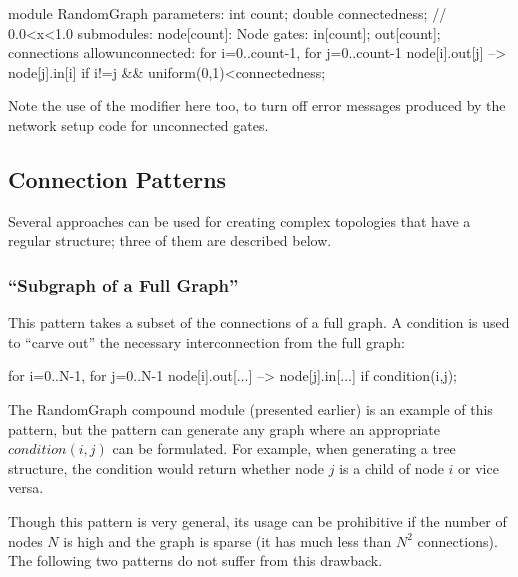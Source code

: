 \begin{ned}
module RandomGraph {
    parameters:
        int count;
        double connectedness; // 0.0<x<1.0
    submodules:
        node[count]: Node {
            gates:
                in[count];
                out[count];
        }
    connections allowunconnected:
        for i=0..count-1, for j=0..count-1 {
            node[i].out[j] --> node[j].in[i]
                if i!=j && uniform(0,1)<connectedness;
        }
}
\end{ned}

Note the use of the  modifier
here too, to turn off error messages produced by the network setup code
for unconnected gates.


\subsection{Connection Patterns}
\label{sec:ned-lang:connection-design-patterns}


Several approaches can be used for creating complex topologies that have a
regular structure; three of them are described below.


\subsubsection{``Subgraph of a Full Graph''}
\label{sec:ned-lang:subgraph-of-full-graph}


This pattern takes a subset of the connections of a full graph.  A
condition is used to ``carve out'' the necessary interconnection from
the full graph:

\begin{ned}
for i=0..N-1, for j=0..N-1 {
    node[i].out[...] --> node[j].in[...] if condition(i,j);
}
\end{ned}

The RandomGraph compound module (presented earlier) is an example of
this pattern, but the pattern can generate any graph where an
appropriate $condition(i,j)$ can be formulated. For example,
when generating a tree structure, the condition
would return whether node $j$ is a child of node $i$ or
vice versa.

Though this pattern is very general, its usage can be prohibitive if
the number of nodes $N$ is high and the graph is sparse (it has
much less than $N^2$ connections). The following
two patterns do not suffer from this drawback.


